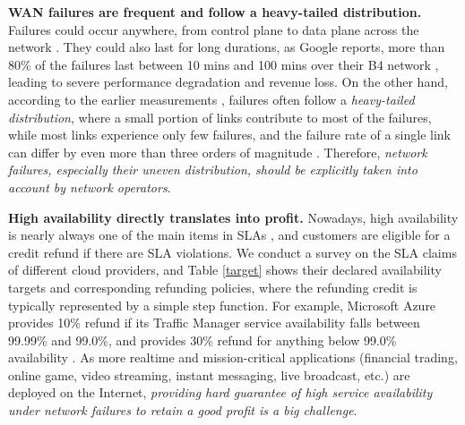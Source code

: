 \documentclass[sigconf]{acmart}
\begin{document}
\textbf{WAN failures are frequent and follow a heavy-tailed distribution.}
Failures could occur anywhere, from control plane to data plane across the network \cite{Teavar}.
They could also last for long durations, 
as Google reports, more than 80\% of the failures last between 10 mins and 100 mins over their B4 network \cite{evole,riskbased}, 
leading to severe performance degradation and revenue loss.
On the other hand, 
according to the earlier measurements \cite{california,understanding}, failures often follow a \textit{heavy-tailed distribution},
where a small portion of links contribute to most of the failures, while most links experience only few failures, and the failure rate of
a single link can differ by even more than three orders of magnitude \cite{failureslarge,Teavar}.
Therefore, \textit{network failures, especially their uneven distribution, should be explicitly taken into account by network operators}. 


\textbf{High availability directly translates into profit.}
Nowadays, high availability is nearly always one of the main items in SLAs  \cite{amazon,azure,amazon2}, and customers are eligible for a credit refund  if there are SLA violations. 
We conduct a survey on the SLA claims of different cloud providers, and Table \ref{target} shows their declared availability targets and  corresponding refunding policies,
where the refunding credit is typically represented by a simple step function. 
For example, Microsoft Azure provides 10\% refund if its Traffic Manager service availability falls between 99.99\% and
99.0\%, and provides 30\% refund for anything below 99.0\% availability \cite{azure}. As more realtime and mission-critical applications (financial trading, online game, video streaming,
instant messaging, live broadcast, etc.) are deployed on the Internet, \textit{providing hard guarantee of high service availability under network failures to retain a good profit is a big challenge}.
\end{document}
